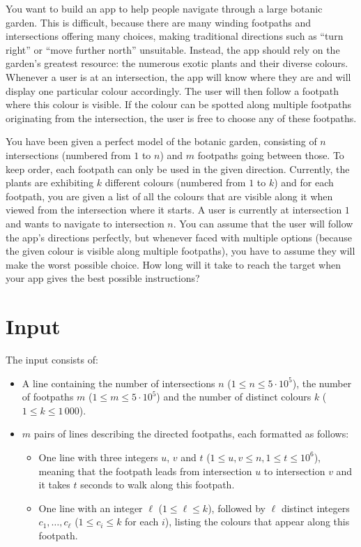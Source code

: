 
%
You want to build an app to help people navigate through a large botanic garden. This is difficult, because there are many winding footpaths and intersections offering many choices, making traditional directions such as ``turn right'' or ``move further north'' unsuitable. Instead, the app should rely on the garden's greatest resource: the numerous exotic plants and their diverse colours. Whenever a user is at an intersection, the app will know where they are and will display one particular colour accordingly. The user will then follow a footpath where this colour is visible. If the colour can be spotted along multiple footpaths originating from the intersection, the user is free to choose any of these footpaths.


You have been given a perfect model of the botanic garden, consisting of $n$ intersections (numbered from $1$ to $n$) and $m$ footpaths going between those. To keep order, each footpath can only be used in the given direction. Currently, the plants are exhibiting $k$ different colours (numbered from $1$ to $k$) and for each footpath, you are given a list of all the colours that are visible along it when viewed from the intersection where it starts. A user is currently at intersection $1$ and wants to navigate to intersection $n$. You can assume that the user will follow the app's directions perfectly, but whenever faced with multiple options (because the given colour is visible along multiple footpaths), you have to assume they will make the worst possible choice. How long will it take to reach the target when your app gives the best possible instructions?


\section*{Input}
The input consists of:
\begin{itemize}
	\item A line containing the number of intersections $n$ ($1 \leq n \leq 5 \cdot 10^5$), the number of footpaths $m$ ($1 \leq m \leq 5 \cdot 10^5$) and the number of distinct colours $k$ ($1 \leq k \leq 1\,000$).
	\item $m$ pairs of lines describing the directed footpaths, each formatted as follows:
	\begin{itemize}
		\item One line with three integers $u$, $v$ and $t$ ($1 \le u,v \le n, 1 \le t \le 10^6$), meaning that the footpath leads from intersection $u$ to intersection $v$ and it takes $t$ seconds to walk along this footpath.
		\item One line with an integer $\ell$ ($1 \leq \ell \leq k$), followed by $\ell$ distinct integers $c_1,\dots,c_\ell$ ($1 \le c_i \le k$ for each $i$), listing the colours that appear along this footpath.
	\end{itemize}
\end{itemize}

